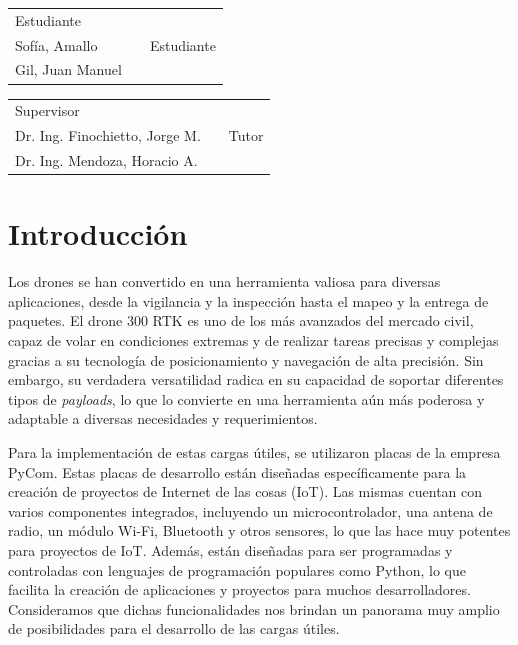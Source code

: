 \documentclass[12pt]{article}
\begin{document}
\vspace{1.5cm}
\begin{tabular}{p{5.5cm}cp{5.5cm}}
  \cline{1-1} \cline{3-3} \\
  \centering Estudiante   \\ Sofía, Amallo && \centering Estudiante \\ Gil, Juan Manuel
\end{tabular}

\vspace{1.5cm}

\begin{tabular}{p{5.5cm}cp{5.5cm}}
  \cline{1-1} \cline{3-3} \\
  \centering Supervisor   \\ Dr. Ing. Finochietto, Jorge M. && \centering Tutor \\ Dr. Ing. Mendoza, Horacio A.
\end{tabular}

\setlength\parindent{24pt}
\newpage
\section{Introducción}

Los drones se han convertido en una herramienta valiosa para diversas aplicaciones, desde la vigilancia y la inspección hasta el mapeo y la entrega de paquetes. El drone 300 RTK es uno de los más avanzados del mercado civil, capaz de volar en condiciones extremas y de realizar tareas precisas y complejas gracias a su tecnología de posicionamiento y navegación de alta precisión. Sin embargo, su verdadera versatilidad radica en su capacidad de soportar diferentes tipos de \textit{payloads}, lo que lo convierte en una herramienta aún más poderosa y adaptable a diversas necesidades y requerimientos.

Para la implementación de estas cargas útiles, se utilizaron placas de la empresa PyCom. Estas placas de desarrollo están diseñadas específicamente para la creación de proyectos de Internet de las cosas (IoT). Las mismas cuentan con varios componentes integrados, incluyendo un microcontrolador, una antena de radio, un módulo Wi-Fi, Bluetooth y otros sensores, lo que las hace muy potentes para proyectos de IoT. Además, están diseñadas para ser programadas y controladas con lenguajes de programación populares como Python, lo que facilita la creación de aplicaciones y proyectos para muchos desarrolladores. Consideramos que dichas funcionalidades nos brindan un panorama muy amplio de posibilidades para el desarrollo de las cargas útiles.
\end{document}
